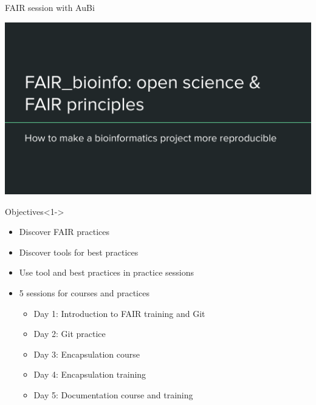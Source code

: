 \begin{frame}{FAIR session with AuBi}


\begin{frame}
\includegraphics[page=13,scale=0.6]{01_OS_and_FAIR_intro.pdf}
\end{frame}

\begin{block}{Objectives}<1->
\begin{itemize}
\item Discover FAIR practices
\item Discover tools for best practices
\item Use tool and best practices in practice sessions
\item 5 sessions for courses and practices
	\begin{itemize}
	\item Day 1: Introduction to FAIR training and Git
	\item Day 2: Git practice
	\item Day 3: Encapsulation course
	\item Day 4: Encapsulation training
	\item Day 5: Documentation course and training
	\end{itemize}
\end{itemize}
\end{block}
\end{frame}

